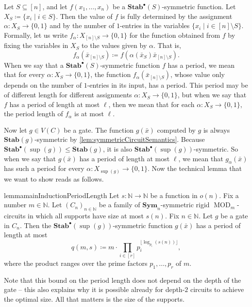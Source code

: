 \documentclass[11pt]{article}
\DeclareMathOperator{\supp}{sup}
\DeclareMathOperator{\MOD}{MOD}
\newcommand{\Sym}{\mathbf{Sym}}
\newcommand{\Stab}{\mathbf{Stab}}
\newcommand{\StabP}{\mathbf{Stab}^{\bullet}}
\newcommand{\bbN}{\mathbb{N}}
\theoremstyle{definition}
\theoremstyle{plain}
\theoremstyle{remark}
\theoremstyle{remark}
\begin{document}
Let $S \subseteq [n]$, and let $f(x_1, \dots, x_n)$ be a $\StabP(S)$-symmetric function. Let $X_S \coloneqq \{x_i \mid i \in S\}$.
Then the value of $f$ is fully determined by the assignment $\alpha \colon X_S \to \{0,1\}$ and by the number of $1$-entries in the variables $\{x_i \mid i \in [n] \setminus S \}$.
Formally, let us write $f_\alpha \colon X_{[n] \setminus S} \to \{0,1\}$ for the function obtained from $f$ by fixing the variables in $X_S$ to the values given by $\alpha$. That is, \[
f_\alpha(\bar{x}_{[n] \setminus S}) \coloneqq f(\alpha(\bar{x}_S)\bar{x}_{[n] \setminus S}).
\]
When we say that a $\StabP(S)$-symmetric function $f$ has a period, we mean that for every $\alpha \colon X_S \to \{0,1\}$, the function $f_\alpha(\bar{x}_{[n] \setminus S})$, whose value only depends on the number of $1$-entries in its input, has a period. This period may be of different length for different assignments $\alpha \colon X_S \to \{0,1\}$, but when we say that $f$ has a period of length at most $\ell$, then we mean that for each $\alpha \colon X_S \to \{0,1\}$, the period length of $f_\alpha$ is at most $\ell$.

Now let $g \in V(C)$ be a gate. The function $g(\bar{x})$ computed by $g$ is always $\Stab(g)$-symmetric by \cref{lem:symmetricCircuitSemantics}. Because $\StabP(\supp(g)) \leq \Stab(g)$, it is also $\StabP(\supp(g))$-symmetric. So when we say that $g(\bar{x})$ has a period of length at most $\ell$, we mean that $g_\alpha(\bar{x})$ has such a period for every $\alpha \colon X_{\supp(g)} \to \{0,1\}$.
Now the technical lemma that we want to show reads as follows. 
\begin{restatable}{lemma}{mainInductionPeriodLength}
\label{lem:inductionPeriodLength}
Let $s \colon \bbN \to \bbN$ be a function in $o(n)$. Fix a number $m \in \bbN$.
Let $(C_n)_{n \in \bbN}$ be a family of $\Sym_n$-symmetric rigid $\MOD_m$-circuits in which all supports have size at most $s(n)$. Fix $n \in \bbN$.
Let $g$ be a gate in $C_n$. Then the $\StabP(\supp(g))$-symmetric function $g(\bar{x})$ has a period of length at most 
\[
q(m,s) \coloneqq m \cdot \prod_{i \in [r]} p_i^{\lfloor \log_{p_i}(s(n)) \rfloor},
\]
where the product ranges over the prime factors $p_1, \dots, p_r$ of $m$.
\end{restatable}
Note that this bound on the period length does not depend on the depth of the gate -- this also explains why it is possible already for depth-$2$ circuits to achieve the optimal size. All that matters is the size of the supports.
\end{document}
